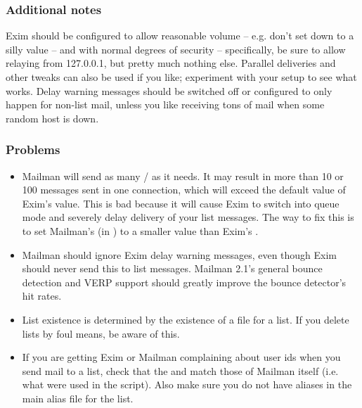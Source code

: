 \documentclass{howto}
\begin{document}
\subsubsection{Additional notes}

Exim should be configured to allow reasonable volume -- e.g. don't set
 down to a silly value -- and with normal degrees of
security -- specifically, be sure to allow relaying from 127.0.0.1, but pretty
much nothing else.  Parallel deliveries and other tweaks can also be used if
you like; experiment with your setup to see what works.  Delay warning
messages should be switched off or configured to only happen for non-list
mail, unless you like receiving tons of mail when some random host is down.

\subsubsection{Problems}

\begin{itemize}

\item Mailman will send as many / as it needs.
      It may result in more than 10 or 100 messages sent in one connection,
      which will exceed the default value of Exim's
       value.  This is bad because it
      will cause Exim to switch into queue mode and severely delay delivery of
      your list messages.  The way to fix this is to set Mailman's
       (in
      ) to a smaller value than Exim's
      .

\item Mailman should ignore Exim delay warning messages, even though Exim
      should never send this to list messages.  Mailman 2.1's general bounce
      detection and VERP support should greatly improve the bounce detector's
      hit rates.

\item List existence is determined by the existence of a 
      file for a list.  If you delete lists by foul means, be aware of this.

\item If you are getting Exim or Mailman complaining about user ids when you
      send mail to a list, check that the  and
       match those of Mailman itself (i.e. what were used
      in the  script).  Also make sure you do not have
      aliases in the main alias file for the list.
\end{itemize}
\end{document}
